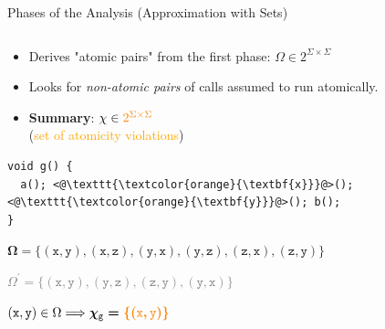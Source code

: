 \documentclass[10pt, xcolor=pdflatex, hyperref={unicode}, aspectratio=169]{beamer}
\begin{document}
\begin{frame}[fragile]{Phases of the Analysis (Approximation with Sets)}
\begin{columns}
\begin{column}[T]{.45 \linewidth}
            \begin{itemize}
                \item Derives "\alert{atomic pairs}" from the first phase: $ \Omega \in 2^{\Sigma \times \Sigma} $
            
                \item Looks for \emph{non-atomic pairs} of calls assumed to \alert{run atomically}.

                \item \textbf{Summary}: $ \chi \in \textcolor{orange}{2^{\Sigma \times \Sigma}} $ \\
                    (\textcolor{orange}{set of atomicity violations})
            \end{itemize}
            
            \medskip

\begin{lstlisting}
void g() {
  a(); <@\texttt{\textcolor{orange}{\textbf{x}}}@>(); <@\texttt{\textcolor{orange}{\textbf{y}}}@>(); b();
}
\end{lstlisting}

            \medskip
            \centering
            \footnotesize
            
            $ \boldsymbol{\Omega = \{(\mathtt{x, y}), (\mathtt{x, z}), (\mathtt{y, x}), (\mathtt{y, z}), (\mathtt{z, x}), (\mathtt{z, y})\}} $
            
            \smallskip
            
            \textcolor{gray}{$ \Omega^\prime = \{(\mathtt{x, y}), (\mathtt{y, z}), (\mathtt{z, y}), (\mathtt{y, x})\} $}
            
            \smallskip
            
            $ (\mathtt{x, y}) \in \Omega \Longrightarrow \boldsymbol{\chi_\mathtt{g} = \textcolor{orange}{\{(\mathtt{x, y})\}}} $
        \end{column}
    \end{columns}
\end{frame}


\end{document}
